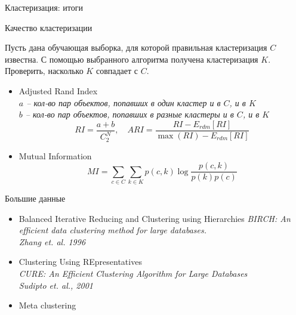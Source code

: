 \documentclass[10pt]{beamer}
\begin{document}

\begin{frame}

\begin{center}
{\Large Кластеризация: итоги}
\end{center}

\end{frame}

\begin{frame}{Качество кластеризации}

Пусть дана обучающая выборка, для которой правильная кластеризация $C$ известна. С помощью выбранного алгоритма получена кластеризация $K$. Проверить, насколько $K$ совпадает с $C$.

\vspace{1em}
\begin{itemize}
\item Adjusted Rand Index \\
{\it \small
$a$ -- кол-во пар объектов, попавших в один кластер и в $C$, и в $K$ \\
$b$ -- кол-во пар объектов, попавших в разные кластеры и в $C$, и в $K$
\[
RI = \frac{a+b}{C^N_2}, \quad ARI = \frac{RI - E_{rdm}[RI]}{\max(RI) - E_{rdm}[RI]}
\]
}
\item Mutual Information \\
{\it \small
\[
MI = \sum_{c \in C} \sum_{k \in K} p(c, k) \log \frac{p(c, k)}{p(k)p(c)}
\]
}
\end{itemize}

\end{frame}

\begin{frame}{Большие данные}

\begin{itemize}
\item Balanced Iterative Reducing and Clustering using Hierarchies
{\it \footnotesize BIRCH: An efficient data clustering method for large databases. \\ Zhang et. al. 1996}
\item Clustering Using REpresentatives \\
{\it \footnotesize CURE: An Efficient Clustering Algorithm for Large Databases \\ Sudipto et. al., 2001}
\item Meta clustering
\end{itemize}

\end{frame}
\end{document}
